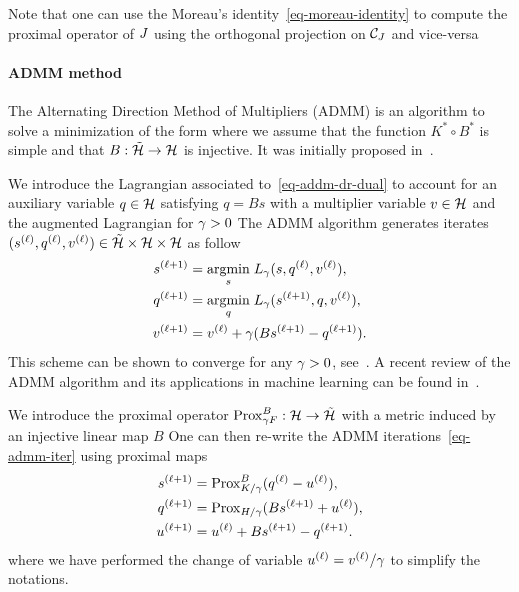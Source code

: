 Note that one can use the Moreau's identity~\eqref{eq-moreau-identity} to compute the proximal operator of $J$ using the orthogonal projection on $\mathcal{C}_J$ and vice-versa

\paragraph{ADMM method}

The Alternating Direction Method of Multipliers (ADMM) is an algorithm to solve a minimization of the form
where we assume that the function $K^* \circ B^*$ is simple and that $B : \tilde{\mathcal{H}} \rightarrow \mathcal{H}$ is injective. It was initially proposed in~\cite{GabayMercier,GlowinskiMarroco}.




We introduce the Lagrangian associated to~\eqref{eq-addm-dr-dual} to account for an auxiliary variable $q \in \mathcal{H}$ satisfying $q=Bs$ with a multiplier variable $v \in \mathcal{H}$
and the augmented Lagrangian for $\gamma > 0$
The ADMM algorithm generates iterates $({s}^{(\ell)}, {q}^{(\ell)}, {v}^{(\ell)})  \in \tilde {\mathcal{H}} \times \mathcal{H} \times \mathcal{H}$ as follow 
\begin{equation}\label{eq-admm-iter}
\begin{aligned}
	\iiter{s} &= \uargmin{s} L_\ga(s,\iter{q},\iter{v}), \\
	\iiter{q} &= \uargmin{q} L_\ga(\iiter{s},q,\iter{v}), \\
	\iiter{v} &= \iter{v} + \ga (B \iiter{s}-\iiter{q}).
\end{aligned}
\end{equation}
This scheme can be shown to converge for any $\gamma > 0$, see~\cite{GabayMercier,GlowinskiMarroco}. A recent review of the ADMM algorithm and its applications in machine learning can be found in~\cite{BoydADMM}.

We introduce the proximal operator $\operatorname{Prox}_{\gamma F}^B : \mathcal{H} \rightarrow \tilde {\mathcal{H}}$ with a metric induced by an injective linear map $B$ 
One can then re-write the ADMM iterations~\eqref{eq-admm-iter} using proximal maps
\begin{equation}\label{eq-admm-prox-iters}
\begin{aligned}
	\iiter{s} &= \prox_{K/\ga }^B ( \iter{q} - \iter{u}), \\
	\iiter{q} &= \prox_{H/\ga } ( B\iiter{s} + \iter{u} ), \\
	\iiter{u} &= \iter{u} + B \iiter{s}-\iiter{q} .
\end{aligned}
\end{equation}
where we have performed the change of variable ${u}^{(\ell)} = {v}^{(\ell)}/\gamma$ to simplify the notations. 

